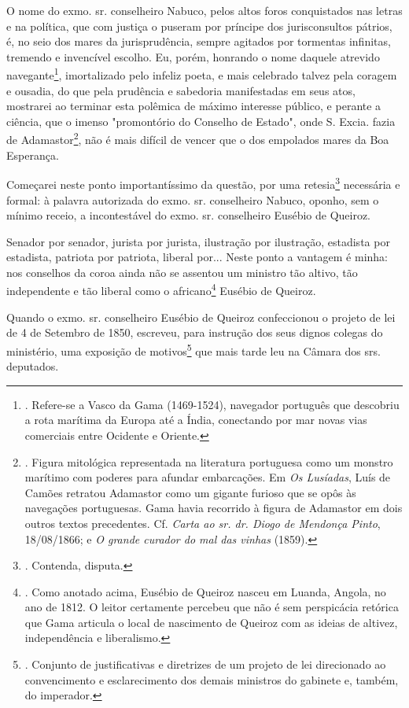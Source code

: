 O nome do exmo. sr. conselheiro Nabuco, pelos altos foros conquistados
nas letras e na política, que com justiça o puseram por príncipe dos
jurisconsultos pátrios, é, no seio dos mares da jurisprudência, sempre
agitados por tormentas infinitas, tremendo e invencível escolho. Eu,
porém, honrando o nome daquele atrevido navegante\footnote{. Refere-se a
  Vasco da Gama (1469-1524), navegador português que descobriu a rota
  marítima da Europa até a Índia, conectando por mar novas vias
  comerciais entre Ocidente e Oriente.}, imortalizado pelo infeliz
poeta, e mais celebrado talvez pela coragem e ousadia, do que pela
prudência e sabedoria manifestadas em seus atos, mostrarei ao terminar
esta polêmica de máximo interesse público, e perante a ciência, que o
imenso "promontório do Conselho de Estado", onde S. Excia. fazia de
Adamastor\footnote{. Figura mitológica representada na literatura
  portuguesa como um monstro marítimo com poderes para afundar
  embarcações. Em \emph{Os Lusíadas}, Luís de Camões retratou Adamastor
  como um gigante furioso que se opôs às navegações portuguesas. Gama
  havia recorrido à figura de Adamastor em dois outros textos
  precedentes. Cf. \emph{Carta ao sr. dr. Diogo de Mendonça Pinto},
  18/08/1866; e \emph{O grande curador do mal das vinhas} (1859).}, não
é mais difícil de vencer que o dos empolados mares da Boa Esperança.

Começarei neste ponto importantíssimo da questão, por uma
retesia\footnote{. Contenda, disputa.} necessária e formal: à palavra
autorizada do exmo. sr. conselheiro Nabuco, oponho, sem o mínimo receio,
a incontestável do exmo. sr. conselheiro Eusébio de Queiroz.

Senador por senador, jurista por jurista, ilustração por ilustração,
estadista por estadista, patriota por patriota, liberal por... Neste
ponto a vantagem é minha: nos conselhos da coroa ainda não se assentou
um ministro tão altivo, tão independente e tão liberal como o
africano\footnote{. Como anotado acima, Eusébio de Queiroz nasceu em
  Luanda, Angola, no ano de 1812. O leitor certamente percebeu que não é
  sem perspicácia retórica que Gama articula o local de nascimento de
  Queiroz com as ideias de altivez, independência e liberalismo.}
Eusébio de Queiroz.

Quando o exmo. sr. conselheiro Eusébio de Queiroz confeccionou o projeto
de lei de 4 de Setembro de 1850, escreveu, para instrução dos seus
dignos colegas do ministério, uma exposição de motivos\footnote{.
  Conjunto de justificativas e diretrizes de um projeto de lei
  direcionado ao convencimento e esclarecimento dos demais ministros do
  gabinete e, também, do imperador.} que mais tarde leu na Câmara dos
srs. deputados.

